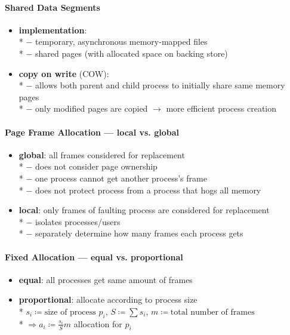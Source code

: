 \paragraph{Shared Data Segments}
\begin{itemize}
  \item \textbf{implementation}: \\*
    $ - $ temporary, asynchronous memory-mapped files \\*
    $ - $ shared pages (with allocated space on backing store)
  \item \textbf{copy on write} (COW): \\*
    $ - $ allows both parent and child process to initially share same memory pages \\*
    $ - $ only modified pages are copied $ \to $ more efficient process creation
\end{itemize}

\paragraph{Page Frame Allocation --- local vs. global}
\begin{itemize}
  \item \textbf{global}: all frames considered for replacement \\*
    $ - $ does not consider page ownership \\*
    $ - $ one process cannot get another process's frame \\*
    $ - $ does not protect process from a process that hogs all memory
  \item \textbf{local}: only frames of faulting process are considered for replacement \\*
    $ - $ isolates processes/users \\*
    $ - $ separately determine how many frames each process gets
\end{itemize}

\paragraph{Fixed Allocation --- equal vs. proportional}
\begin{itemize}
  \item \textbf{equal}: all processes get same amount of frames
  \item \textbf{proportional}: allocate according to process size \\*
    $ s_i \coloneqq \text{size of process } p_i $, $ S \coloneqq \sum s_i $, $ m \coloneqq \text{total number of frames } $ \\*
    $ \Rightarrow a_i \coloneqq \frac{s_i}{S}m $ allocation for $ p_i $
\end{itemize}

